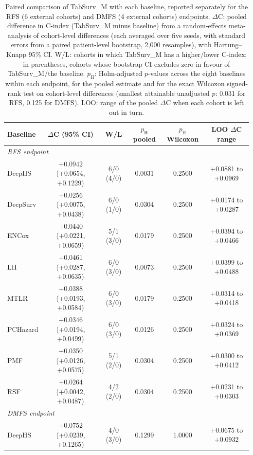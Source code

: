 \begin{table}[t]
\centering
\caption{Paired comparison of TabSurv\_M with each baseline, reported separately for the RFS (6 external cohorts) and DMFS (4 external cohorts) endpoints. $\Delta$C: pooled difference in C-index (TabSurv\_M minus baseline) from a random-effects meta-analysis of cohort-level differences (each averaged over five seeds, with standard errors from a paired patient-level bootstrap, 2{,}000 resamples), with Hartung--Knapp 95\% CI. W/L: cohorts in which TabSurv\_M has a higher/lower C-index; in parentheses, cohorts whose bootstrap CI excludes zero in favour of TabSurv\_M/the baseline. $p_{\mathrm{H}}$: Holm-adjusted $p$-values across the eight baselines within each endpoint, for the pooled estimate and for the exact Wilcoxon signed-rank test on cohort-level differences (smallest attainable unadjusted $p$: 0.031 for RFS, 0.125 for DMFS). LOO: range of the pooled $\Delta$C when each cohort is left out in turn.}
\label{tab:statistical_comparison}
\footnotesize
\setlength{\tabcolsep}{4pt}
\begin{tabular}{lccccc}
\toprule
Baseline & $\Delta$C (95\% CI) & W/L & $p_{\mathrm{H}}$ pooled & $p_{\mathrm{H}}$ Wilcoxon & LOO $\Delta$C range \\
\midrule
\multicolumn{6}{l}{\textit{RFS endpoint}} \\
DeepHS & +0.0942 (+0.0654, +0.1229) & 6/0 (4/0) & 0.0031 & 0.2500 & +0.0881 to +0.0969 \\
DeepSurv & +0.0256 (+0.0075, +0.0438) & 6/0 (1/0) & 0.0304 & 0.2500 & +0.0174 to +0.0287 \\
ENCox & +0.0440 (+0.0221, +0.0659) & 5/1 (3/0) & 0.0179 & 0.2500 & +0.0394 to +0.0466 \\
LH & +0.0461 (+0.0287, +0.0635) & 6/0 (3/0) & 0.0073 & 0.2500 & +0.0399 to +0.0488 \\
MTLR & +0.0388 (+0.0193, +0.0584) & 6/0 (3/0) & 0.0179 & 0.2500 & +0.0314 to +0.0418 \\
PCHazard & +0.0346 (+0.0194, +0.0499) & 6/0 (3/0) & 0.0126 & 0.2500 & +0.0324 to +0.0369 \\
PMF & +0.0350 (+0.0126, +0.0575) & 5/1 (2/0) & 0.0304 & 0.2500 & +0.0300 to +0.0412 \\
RSF & +0.0264 (+0.0042, +0.0487) & 4/2 (2/0) & 0.0304 & 0.2500 & +0.0231 to +0.0303 \\
\midrule
\multicolumn{6}{l}{\textit{DMFS endpoint}} \\
DeepHS & +0.0752 (+0.0239, +0.1265) & 4/0 (3/0) & 0.1299 & 1.0000 & +0.0675 to +0.0932 \\

\end{tabular}
\end{table}
